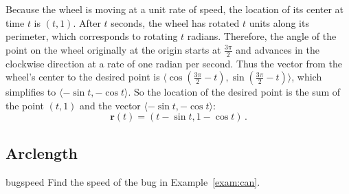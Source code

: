 \documentclass{watsonbook}
\begin{document}
\begin{solution}
  Because the wheel is moving at a unit rate of speed, the location of
  its center at time $t$ is $(t,1)$. After $t$ seconds, the wheel has
  rotated $t$ units along its perimeter, which corresponds to rotating
  $t$ radians. Therefore, the angle of the point on the wheel
  originally at the origin starts at $\tfrac{3\pi}{2}$ and advances in
  the clockwise direction at a rate of one radian per second. Thus the
  vector from the wheel's center to the desired point is
  $\langle \cos\left(\tfrac{3\pi}{2}-t\right),
  \sin\left(\tfrac{3\pi}{2}-t\right)\rangle$, which simplifies to
  $\langle -\sin t, - \cos t \rangle$. So the location of the
  desired point is the sum of the point $(t,1)$ and the vector
  $\langle -\sin t, - \cos t \rangle$:
  \[
    \boxed{\mathbf{r}(t) = (t - \sin t, 1- \cos t)}\,.
  \]
\end{solution}

\subsection{Arclength} \label{subsec:arclength} 

\begin{example}{}{bugspeed}
  Find the speed of the bug in Example~\ref{exam:can}. 
\end{example}
\end{document}
